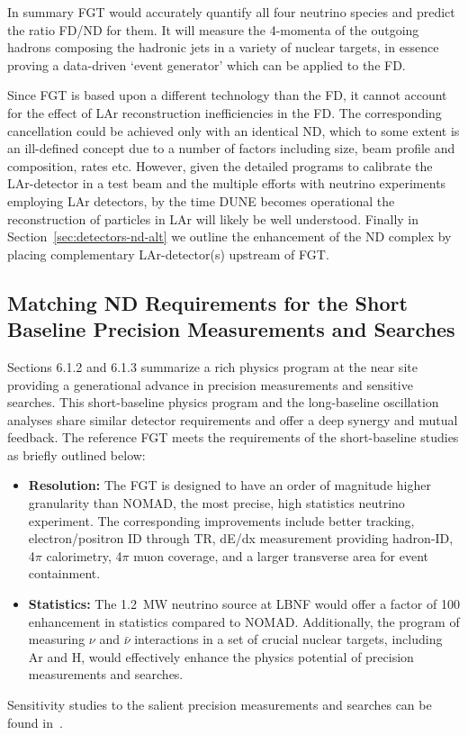 In summary FGT would accurately quantify all four neutrino species and predict the ratio FD/ND for them. 
It will measure the 4-momenta of the outgoing hadrons composing the hadronic jets in a variety of 
nuclear targets, in essence proving a data-driven `event generator' which can be applied to the FD. 

Since FGT is based upon a different technology than the FD, it cannot account for 
the effect of LAr reconstruction inefficiencies in the FD. The corresponding cancellation could be achieved only 
with an identical ND, which to some extent is an ill-defined concept due to a number of factors including size, 
beam profile and composition, rates etc. However, given the detailed programs to calibrate the LAr-detector 
in a test beam and the multiple efforts with neutrino experiments employing LAr detectors, by the time DUNE 
becomes operational the reconstruction of particles in LAr will likely be well understood. Finally in 
Section~\ref{sec:detectors-nd-alt} we outline the enhancement of the ND complex by placing 
complementary LAr-detector(s) upstream of FGT. 

\subsection{Matching ND Requirements for the Short Baseline Precision Measurements and Searches} 
\label{cdrsec:detectors-nd-ref-fgt-req-sbp}


Sections 6.1.2
and 6.1.3 %
summarize a rich physics program at the near site providing a
generational advance in precision measurements and sensitive searches.
This short-baseline physics program and the long-baseline oscillation
analyses share similar detector requirements and offer a deep synergy
and mutual feedback.  The reference FGT meets the requirements of the
short-baseline studies as briefly outlined below:
\begin{itemize}
    \item {\bf Resolution:} The FGT is designed to have an order of magnitude higher granularity than NOMAD, 
    the most precise, high statistics neutrino experiment. The corresponding improvements include better tracking, 
    electron/positron ID through TR, dE/dx measurement providing hadron-ID, 4$\pi$ calorimetry,
     4$\pi$ muon coverage, and a larger transverse area for event containment. 
    
    \item {\bf Statistics:} The 1.2~MW neutrino source at LBNF would offer a factor of 100 enhancement in statistics 
    compared to NOMAD. Additionally, the program of measuring $\nu$ and $\bar\nu$ interactions 
    in a set of crucial nuclear targets, including Ar and H, would effectively enhance the physics potential 
    of precision measurements and searches.  
\end{itemize}
Sensitivity studies to the salient precision measurements and searches can be found in~\cite{Adams:2013qkq, DPR}. 


